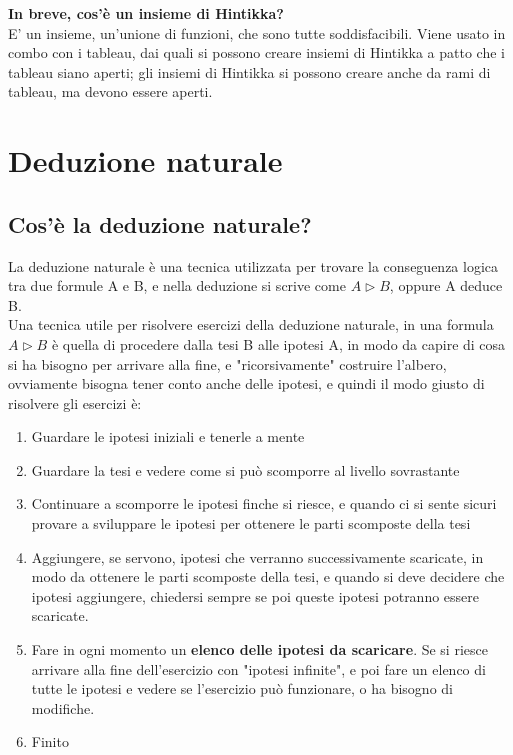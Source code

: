 \documentclass[11pt]{article}
\begin{document}
\textbf{In breve, cos'è un insieme di Hintikka?}\\
E' un insieme, un'unione di funzioni, che sono tutte soddisfacibili. Viene usato in combo con i tableau, dai quali si possono creare insiemi di Hintikka a patto che i tableau siano aperti; gli insiemi di Hintikka si possono creare anche da rami di tableau, ma devono essere aperti.

\section{Deduzione naturale}
\subsection{Cos'è la deduzione naturale?}
La deduzione naturale è una tecnica utilizzata per trovare la conseguenza logica tra due formule A e B, 
e nella deduzione si scrive come $A \triangleright B$, oppure A deduce B.\\
Una tecnica utile per risolvere esercizi della deduzione naturale, in una formula $A \triangleright B$
 è quella di procedere dalla tesi B alle ipotesi A, in modo da capire di cosa si ha bisogno per arrivare alla fine, e "ricorsivamente" 
 costruire l'albero, ovviamente bisogna tener conto anche delle ipotesi, e quindi il modo 
 giusto di risolvere gli esercizi è:
 \begin{enumerate}
     \item Guardare le ipotesi iniziali e tenerle a mente
     \item Guardare la tesi e vedere come si può scomporre al livello sovrastante
     \item Continuare a scomporre le ipotesi finche si riesce, e quando ci si sente sicuri provare a 
     sviluppare le ipotesi per ottenere le parti scomposte della tesi
     \item Aggiungere, se servono, ipotesi che verranno successivamente scaricate, in modo da ottenere le parti scomposte della tesi, 
     e quando si deve decidere che ipotesi aggiungere, chiedersi sempre se poi queste ipotesi potranno essere scaricate.
     \item Fare in ogni momento un \textbf{elenco delle ipotesi da scaricare}. Se si riesce arrivare alla fine dell'esercizio con "ipotesi infinite",
      e poi fare un elenco di tutte le ipotesi e vedere se l'esercizio può funzionare, o ha bisogno di modifiche.
     \item Finito
 \end{enumerate}
\end{document}
